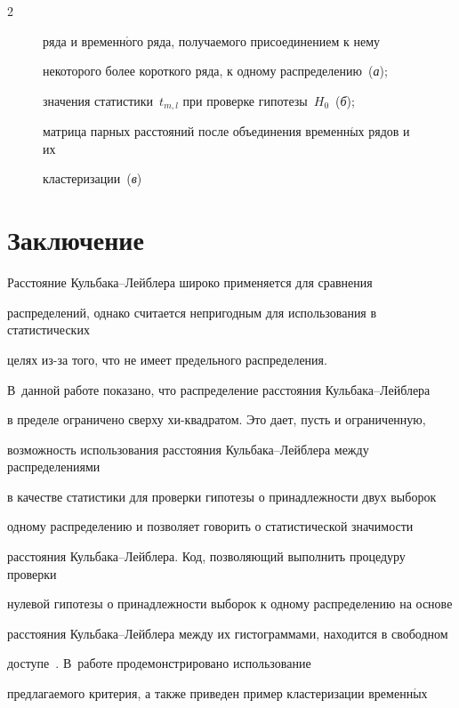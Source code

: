 \begin{multicols}{2}
\begin{figure}
{ряда и временн$\acute{\mbox{о}}$го ряда, получаемого присоединением к нему

некоторого более короткого ряда, к одному распределению~(\textit{а});

значения статистики~$t_{m,l}$ при проверке гипотезы~$H_0$~(\textit{б});

матрица парных расстояний после объединения временн$\acute{\mbox{ы}}$х рядов и их

кластеризации~(\textit{в})}

\label{fg:KLtest}

\end{figure}













\section{Заключение}



Расстояние Кульбака--Лейблера широко применяется для сравнения

распределений, однако считается непригодным для использования в статистических

целях из-за того, что не имеет предельного распределения.

В~данной работе показано, что распределение расстояния Кульбака--Лейблера

в пределе ограничено сверху хи-квад\-ра\-том. Это дает, пусть и ограниченную,

возможность использования расстояния Куль\-ба\-ка--Лейб\-ле\-ра между распределениями

в качестве статистики для проверки гипотезы о принадлежности двух выборок

одному распределению и позволяет говорить о статистической значимости

расстояния Куль\-ба\-ка--Лейб\-ле\-ра. Код, позволяющий выполнить процедуру проверки

нулевой гипотезы о принадлежности выборок к одному распределению на основе

расстояния Кульбака--Лейблера между их гистограммами, находится в свободном

доступе~\cite{KLtestCode}. В~работе продемонстрировано использование

предлагаемого критерия, а также приведен пример кластеризации временн$\acute{\mbox{ы}}$х


\end{multicols}

